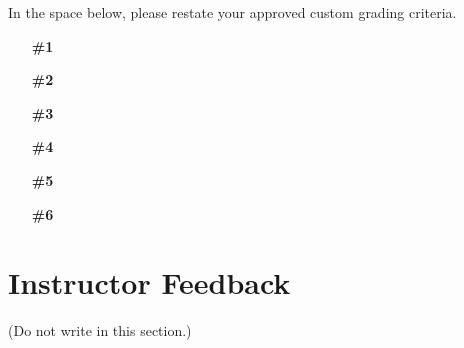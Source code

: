 \documentclass[10pt]{article}
\begin{document}
In the space below, please restate your approved custom grading criteria.
\begin{itemize}
\item[{\bf \#1}]
\item[{\bf \#2}]
\item[{\bf \#3}]
\item[{\bf \#4}]
\item[{\bf \#5}]
\item[{\bf \#6}]
\end{itemize}

\pagebreak
\section{Instructor Feedback}

(Do not write in this section.)
\end{document}
